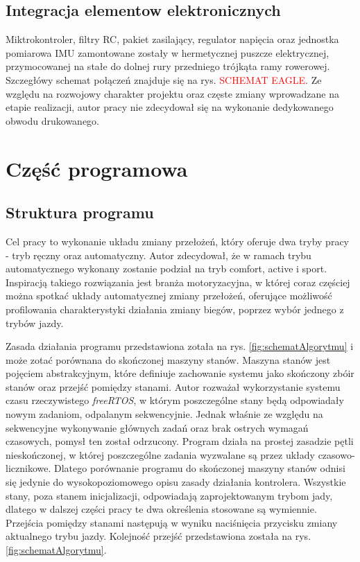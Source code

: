\subsection{Integracja elementow elektronicznych}
Miktrokontroler, filtry RC, pakiet zasilający, regulator napięcia oraz jednostka pomiarowa IMU zamontowane zostały w hermetycznej puszcze elektrycznej, przymocowanej na stałe do dolnej rury przedniego trójkąta ramy rowerowej. Szczegłówy schemat połączeń znajduje się na rys. \textcolor{red}{SCHEMAT EAGLE}. Ze względu na rozwojowy charakter projektu oraz częste zmiany wprowadzane na etapie realizacji, autor pracy nie zdecydował się na wykonanie dedykowanego obwodu drukowanego.

\section{Część programowa}
\subsection{Struktura programu}

Cel pracy to wykonanie układu zmiany przełożeń, który oferuje dwa tryby pracy - tryb ręczny oraz automatyczny. Autor zdecydował, że w ramach trybu automatycznego wykonany zostanie podział na tryb comfort, active i sport. Inspiracją  takiego rozwiązania jest branża motoryzacyjna, w której coraz częściej można spotkać układy automatycznej zmiany przełożeń, oferujące możliwość profilowania charakterystyki działania zmiany biegów, poprzez wybór jednego z trybów jazdy. 

Zasada działania programu przedstawiona zotała na rys. \ref{fig:schematAlgorytmu} i może zotać porównana do skończonej maszyny stanów. Maszyna stanów jest pojęciem abstrakcyjnym, które definiuje zachowanie systemu jako skończony zbóir stanów oraz przejść pomiędzy stanami. Autor rozważał wykorzystanie systemu czasu rzeczywistego \textit{freeRTOS}, w którym poszczególne stany będą odpowiadały nowym zadaniom, odpalanym sekwencyjnie. Jednak właśnie ze względu na sekwencyjne wykonywanie głównych zadań oraz brak ostrych wymagań czasowych, pomysł ten został odrzucony. Program działa na prostej zasadzie pętli nieskończonej, w której poszczególne zadania wyzwalane są przez układy czasowo-licznikowe. Dlatego porównanie programu do skończonej maszyny stanów odnisi się jedynie do wysokopoziomowego opisu zasady działania kontrolera. Wszystkie stany, poza stanem inicjalizacji, odpowiadają zaprojektowanym trybom jady, dlatego w dalszej części pracy te dwa określenia stosowane są wymiennie. Przejścia pomiędzy stanami następują w wyniku naciśnięcia przycisku zmiany aktualnego trybu jazdy. Kolejność przejść przedstawiona została na rys. \ref{fig:schematAlgorytmu}.

